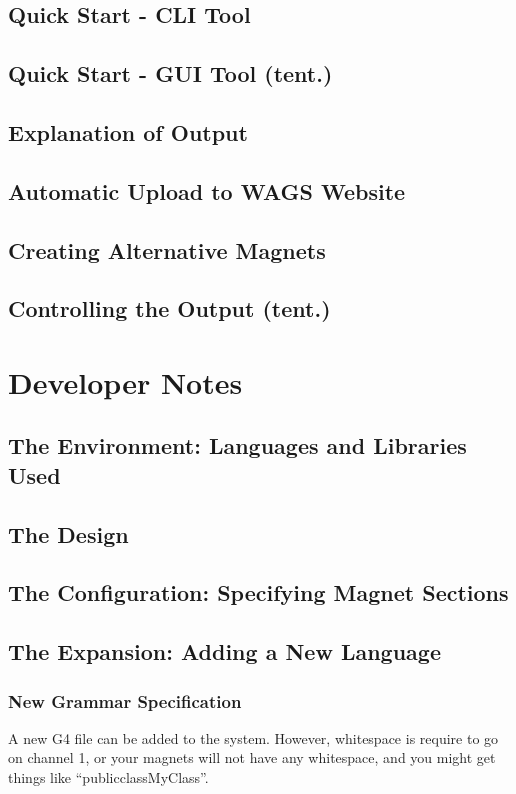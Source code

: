 \documentclass[letter,10pt]{article}
\begin{document}
\subsection{Quick Start - CLI Tool}

\subsection{Quick Start - GUI Tool (tent.)}

\subsection{Explanation of Output}

\subsection{Automatic Upload to WAGS Website}

\subsection{Creating Alternative Magnets}

\subsection{Controlling the Output (tent.)}



\section{Developer Notes}

\subsection{The Environment: Languages and Libraries Used}

\subsection{The Design}

\subsection{The Configuration: Specifying Magnet Sections}

\subsection{The Expansion: Adding a New Language}

\subsubsection{New Grammar Specification}
A new G4 file can be added to the system. However, whitespace is
require to go on channel 1, or your magnets will not have any
whitespace, and you might get things like ``publicclassMyClass''.


{}

\end{document}

